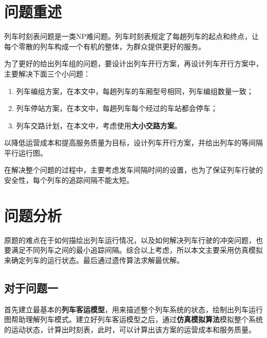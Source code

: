\setcounter{page}{1}        %

%
%

\section{问题重述}



列车时刻表问题是一类NP难问题\cite{caoJiyuchengkedengdaishijiandechengshiguidaojiaotongliecheshikebiaoyouhuamoxingyusuanfayanjiu2021}。列车时刻表规定了每趟列车的起点和终点，让每个零散的列车构成一个有机的整体，为群众提供更好的服务。

为了更好的给出列车组的问题，要设计出列车开行方案，再设计列车开行方案中，主要解决下面三个小问题：

\begin{enumerate}
    \item 列车编组方案，在本文中，每趟列车的车厢型号相同，列车编组数量一致；
    \item 列车停站方案，在本文中，每趟列车每个经过的车站都会停车；
    \item 列车交路计划，在本文中，考虑使用\textbf{大小交路方案}。
\end{enumerate}

以降低运营成本和提高服务质量为目标，设计列车开行方案，并给出列车的等间隔平行运行图。

在解决整个问题的过程中，主要考虑发车间隔时间的设置，也为了保证列车行驶的安全性，每个列车的追踪间隔不能太短。

%
%

\section{问题分析}

原题的难点在于如何描绘出列车运行情况，以及如何解决列车行驶的冲突问题，也要满足不同列车之间的最小追踪间隔。综合以上考虑，所以本文主要采用仿真模拟来确定列车的运行状态。最后通过遗传算法求解最优解。

\subsection{对于问题一}

首先建立最基本的\textbf{列车客运模型}，用来描述整个列车系统的状态，绘制出列车运行图帮助理解列车模式。建立好列车客运模型之后，通过\textbf{仿真模拟算法}模拟整个系统的运动状态，计算出时刻表，此时，可以计算出该方案的运营成本和服务质量。

